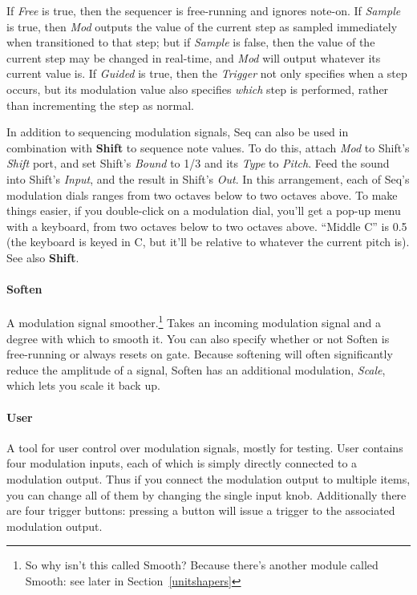 \documentclass{article}
\begin{document}
If {\it Free} is true, then the sequencer is free-running and ignores note-on.  If {\it Sample} is true, then {\it Mod} outputs the value of the current step as sampled immediately when transitioned to that step; but if {\it Sample} is false, then the value of the current step may be changed in real-time, and {\it Mod} will output whatever its current value is.  If {\it Guided} is true, then the {\it Trigger} not only specifies when a step occurs, but its modulation value also specifies {\it which} step is performed, rather than incrementing the step as normal.

In addition to sequencing modulation signals, Seq can also be used in combination with {\bf Shift} to sequence note values.  To do this, attach {\it Mod} to Shift's {\it Shift} port, and set Shift's {\it Bound} to 1/3 and its {\it Type} to {\it Pitch}.  Feed the sound into Shift's {\it Input}, and the result in Shift's {\it Out}.  In this arrangement, each of Seq's modulation dials ranges from two octaves below to two octaves above.  To make things easier, if you double-click on a modulation dial, you'll get a pop-up menu with a keyboard, from two octaves below to two octaves above.  ``Middle C'' is 0.5 (the keyboard is keyed in C, but it'll be relative to whatever the current pitch is).  See also {\bf Shift}.

\paragraph{Soften}  A modulation signal smoother.\footnote{So why isn't this called Smooth?  Because there's another module called Smooth: see later in Section~\ref{unitshapers}}  Takes an incoming modulation signal and a degree with which to smooth it.  You can also specify whether or not Soften is free-running or always resets on gate.   Because softening will often significantly reduce the amplitude of a signal, Soften has an additional modulation, {\it Scale}, which lets you scale it back up.


\paragraph{User}  A tool for user control over modulation signals, mostly for testing.  User contains four modulation inputs, each of which is simply directly connected to a modulation output.  Thus if you connect the modulation output to multiple items, you can change all of them by changing the single input knob. Additionally there are four trigger buttons: pressing a button will issue a trigger to the associated modulation output.
\end{document}
